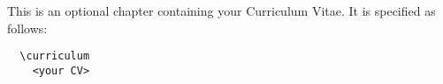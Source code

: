 \curriculum
This is an optional chapter containing your Curriculum Vitae.
It is specified as follows:
\begin{verbatim}
  \curriculum
    <your CV>
\end{verbatim}

